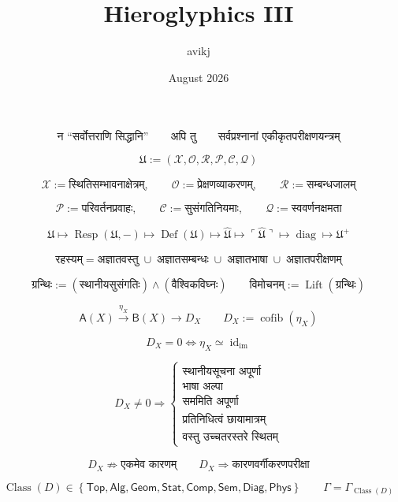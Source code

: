 \documentclass{article}
\title{Hieroglyphics III}
\author{avikj}
\date{August 2026}
\begin{document}
\maketitle

\[\boxed{\text{न ``सर्वोत्तराणि सिद्धानि''}\qquad\text{अपि तु}\qquad
\text{सर्वप्रश्नानां एकीकृतपरीक्षणयन्त्रम्}}\]

\[\boxed{\mathfrak U:=\left(\mathcal X,\mathcal O,\mathcal R,\mathcal P,
\mathcal C,\mathcal Q\right)}\]

\[\mathcal X:=\text{स्थितिसम्भावनाक्षेत्रम्},\qquad
\mathcal O:=\text{प्रेक्षणव्याकरणम्},\qquad
\mathcal R:=\text{सम्बन्धजालम्}\]

\[\mathcal P:=\text{परिवर्तनप्रवाहः},\qquad
\mathcal C:=\text{सुसंगतिनियमाः},\qquad
\mathcal Q:=\text{स्ववर्णनक्षमता}\]

\[\boxed{\mathfrak U\longmapsto\operatorname{Resp}(\mathfrak U,-)
\longmapsto\operatorname{Def}(\mathfrak U)\longmapsto\widehat{\mathfrak U}
\longmapsto\ulcorner\widehat{\mathfrak U}\urcorner\longmapsto\operatorname{diag}
\longmapsto\mathfrak U^{+}}\]

\[\boxed{\text{रहस्यम्}=\text{अज्ञातवस्तु}\;\cup\;\text{अज्ञातसम्बन्धः}
\;\cup\;\text{अज्ञातभाषा}\;\cup\;\text{अज्ञातपरीक्षणम्}}\]

\[\boxed{\text{ग्रन्थिः}:=(\text{स्थानीयसुसंगतिः})\wedge(\text{वैश्विकविघ्नः})}
\qquad
\boxed{\text{विमोचनम्}:=\operatorname{Lift}\left(\text{ग्रन्थिः}\right)}\]

\[\mathsf A(X)\xrightarrow{\eta_X}\mathsf B(X)\xrightarrow{}D_X
\qquad D_X:=\operatorname{cofib}(\eta_X)\]

\[\boxed{D_X=0\iff\eta_X\simeq\operatorname{id}_{\mathrm{im}}}\]

\[D_X\neq0\Longrightarrow\left\{\begin{array}{l}
\text{स्थानीयसूचना अपूर्णा}\\ \text{भाषा अल्पा}\\ \text{सममिति अपूर्णा}\\
\text{प्रतिनिधित्वं छायामात्रम्}\\ \text{वस्तु उच्चतरस्तरे स्थितम्}
\end{array}\right.\]

\[\boxed{D_X\not\Rightarrow\text{एकमेव कारणम्}}\qquad
\boxed{D_X\Rightarrow\text{कारणवर्गीकरणपरीक्षा}}\]

\[\operatorname{Class}(D)\in\left\{\mathsf{Top},\mathsf{Alg},\mathsf{Geom},
\mathsf{Stat},\mathsf{Comp},\mathsf{Sem},\mathsf{Diag},\mathsf{Phys}\right\}
\qquad\boxed{\Gamma=\Gamma_{\operatorname{Class}(D)}}\]
\end{document}
